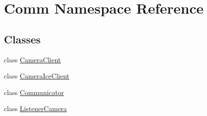 \hypertarget{namespace_comm}{}\section{Comm Namespace Reference}
\label{namespace_comm}
\subsection*{Classes}
\begin{DoxyCompactItemize}
\item 
class \hyperlink{class_comm_1_1_camera_client}{Camera\+Client}
\item 
class \hyperlink{class_comm_1_1_camera_ice_client}{Camera\+Ice\+Client}
\item 
class \hyperlink{class_comm_1_1_communicator}{Communicator}
\item 
class \hyperlink{class_comm_1_1_listener_camera}{Listener\+Camera}
\end{DoxyCompactItemize}
